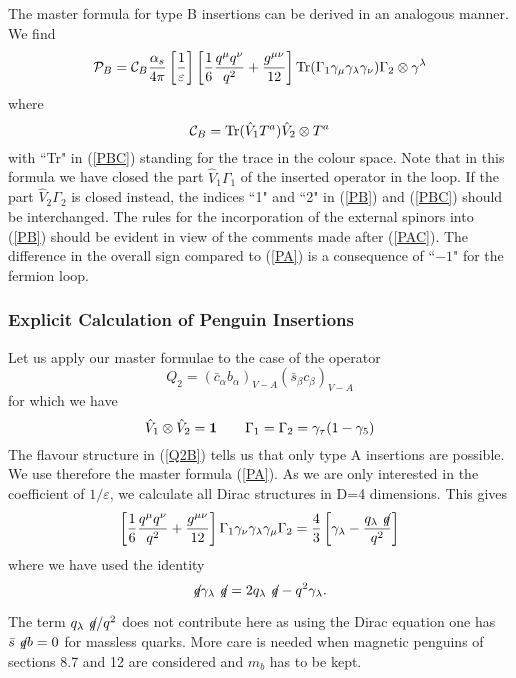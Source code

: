 \documentclass[12pt,rotate]{article}
\def\as{\alpha_s}
\newcommand{\be}{\begin{equation}}
\newcommand{\ee}{\end{equation}}
\begin{document}
\begin{itemize}
\begin{itemize}
The master formula for type B insertions can be derived in an
analogous manner. We find 
\be\label{PB}
{\cal P}_B= {\cal C}_B \frac{\as}{4\pi} 
\left[\frac{1}{\varepsilon}\right]
\left[\frac{1}{6}\frac{q^\mu q^\nu}{q^2}+\frac{g^{\mu\nu}}{12}\right]
{\rm Tr}
(\Gamma_1\gamma_\mu\gamma_\lambda\gamma_\nu)\Gamma_2\otimes \gamma^\lambda
\ee
where
\be\label{PBC}
{\cal C}_B={\rm Tr}(\hat V_1 T^a)\hat V_2\otimes T^a
\ee
with ``Tr" in (\ref{PBC}) standing for the trace in the colour space.
Note that in this formula we have closed the part $\hat V_1\Gamma_1$
of the inserted operator in the loop. If the part $\hat V_2\Gamma_2$
is closed instead, the indices ``1" and ``2" in (\ref{PB}) and
(\ref{PBC}) should be interchanged. The rules for the incorporation
of the external spinors into (\ref{PB}) should be evident in view of the
comments made after (\ref{PAC}). The difference in the overall sign
compared to (\ref{PA}) is a consequence of ``$-1$" for the fermion loop.

\subsubsection{Explicit Calculation of Penguin Insertions}
Let us apply our master formulae to the case of the operator
\be\label{Q2B}
Q_2=(\bar c_\alpha b_\alpha)_{V-A} (\bar s_\beta c_\beta)_{V-A}
\ee
for which we have
\be\label{DICO}
\hat V_1\otimes \hat V_2={\bf 1} \quad\quad 
\Gamma_1=\Gamma_2=\gamma_\tau(1-\gamma_5)
\ee
The flavour structure in (\ref{Q2B}) tells us that only type A insertions
are possible. We use therefore the master formula (\ref{PA}).
As we are only interested in the coefficient of $1/\varepsilon$,
we calculate all Dirac structures in D=4 dimensions. This gives
\be\label{DIRA}
\left[\frac{1}{6}\frac{q^\mu q^\nu}{q^2}+\frac{g^{\mu\nu}}{12}\right]
\Gamma_1\gamma_\nu\gamma_\lambda\gamma_\mu\Gamma_2=
\frac{4}{3}\left[\gamma_\lambda-\frac{q_\lambda\not\! q}{q^2}\right]
\ee
where we have used the identity
\be
\not\! q \gamma_\lambda \not\! q=2 q_\lambda \not\! q-q^2\gamma_\lambda.
\ee

The term $q_\lambda\not\! q/q^2$ does not contribute here as using
the Dirac equation one has $\bar s\not\! q b=0$ for massless quarks. 
More
care is needed when magnetic penguins of sections 8.7 and 12 are considered
and $m_b$ has to be kept.


\end{itemize}
\end{itemize}
\end{document}
